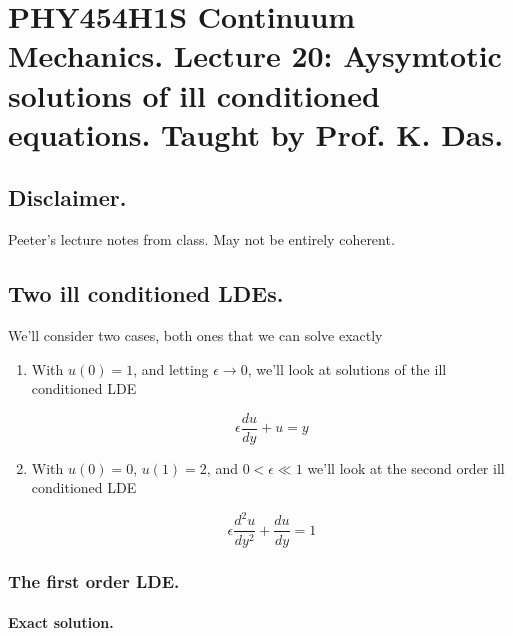 
%

\chapter{PHY454H1S Continuum Mechanics.  Lecture 20: Aysymtotic solutions of ill conditioned equations.  Taught by Prof. K. Das.}
\label{chap:continuumL20}
{}
\date{Mar 28, 2012}

\beginArtWithToc

\section{Disclaimer.}

Peeter's lecture notes from class.  May not be entirely coherent.

\section{Two ill conditioned LDEs.}

We'll consider two cases, both ones that we can solve exactly

\begin{enumerate}
\item With $u(0) = 1$, and letting $\epsilon \rightarrow 0$, we'll look at solutions of the ill conditioned LDE

\begin{equation}\label{eqn:continuumL20:10}
\epsilon \frac{du}{dy} + u = y
\end{equation}

\item With $u(0) = 0$, $u(1) = 2$, and $0 < \epsilon \ll 1$ we'll look at the second order ill conditioned LDE

\begin{equation}\label{eqn:continuumL20:30}
\epsilon \frac{d^2u}{dy^2} + \frac{du}{dy} = 1
\end{equation}
\end{enumerate}

\subsection{The first order LDE.}
\subsubsection{Exact solution.}

